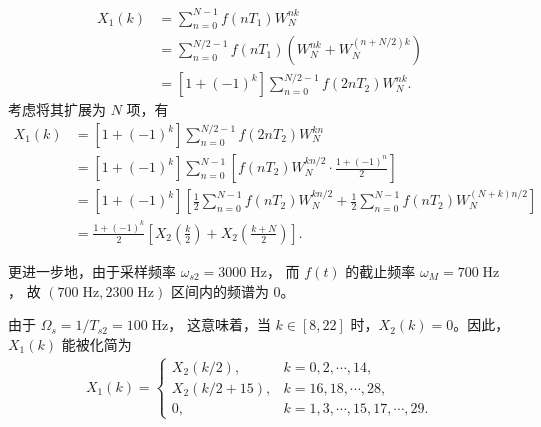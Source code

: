 \begin{solution}
\begin{enumerate}[label=(\arabic*)]
\begin{align*}
                X_1(k) & = \sum_{n = 0}^{N - 1}f(nT_1)W_N^{nk} \\
                & = \sum_{n = 0}^{N/2 - 1}f(nT_1)\left(W_N^{nk} + W_N^{(n+N/2)k}\right) \\
                & = [1 + (-1)^k]\sum_{n = 0}^{N/2 - 1}f(2nT_2)W_N^{nk}.
            \end{align*}
            考虑将其扩展为 $N$ 项，有
            \begin{align*}
                X_1(k) & = [1 + (-1)^k]\sum_{n = 0}^{N/2 - 1}f(2nT_2)W_N^{kn} \\
                & = [1 + (-1)^k]\sum_{n = 0}^{N - 1}\left[f(nT_2)W_N^{kn/2} \cdot \frac{1 + (-1)^n}{2}\right] \\
                & = [1 + (-1)^k]\left[\frac{1}{2}\sum_{n = 0}^{N - 1}f(nT_2)W_N^{kn/2}
                    + \frac{1}{2}\sum_{n = 0}^{N - 1}f(nT_2)W_N^{(N+k)n/2}\right] \\
                & = \frac{1 + (-1)^k}{2}\left[X_2\left(\frac{k}{2}\right) + X_2\left(\frac{k + N}{2}\right)\right].
            \end{align*}
    \end{enumerate}
\end{solution}

\begin{remark}
    更进一步地，由于采样频率 $\omega_{s2} = 3000\;\mathrm{Hz}$，
    而 $f(t)$ 的截止频率 $\omega_M = 700\;\mathrm{Hz}$，
    故 $(700\;\mathrm{Hz}, 2300\;\mathrm{Hz})$ 区间内的频谱为 $0$。
    
    由于 $\Omega_s = 1/T_{s2} = 100\;\mathrm{Hz}$，
    这意味着，当 $k \in [8, 22]$ 时，$X_2(k) = 0$。因此，$X_1(k)$ 能被化简为
    \begin{align*}
        X_1(k) = \begin{cases}
            X_2(k/2), & k = 0, 2, \cdots, 14, \\
            X_2(k/2 + 15), & k = 16, 18, \cdots, 28, \\
            0, & k = 1, 3, \cdots, 15, 17, \cdots, 29.
        \end{cases}
    \end{align*}
\end{remark}
